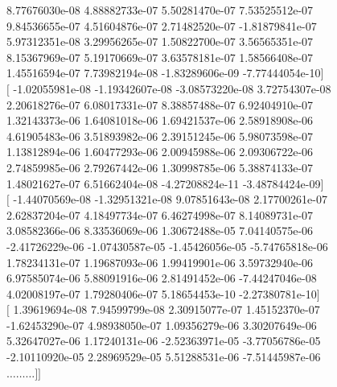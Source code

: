 \documentclass{article}
\begin{document}
    8.77676030e-08   4.88882733e-07   5.50281470e-07   7.53525512e-07 \\
    9.84536655e-07   4.51604876e-07   2.71482520e-07  -1.81879841e-07 \\
    5.97312351e-08   3.29956265e-07   1.50822700e-07   3.56565351e-07 \\
    8.15367969e-07   5.19170669e-07   3.63578181e-07   1.58566408e-07 \\
    1.45516594e-07   7.73982194e-08  -1.83289606e-09  -7.77444054e-10$]$ \\
 $[$ -1.02055981e-08  -1.19342607e-08  -3.08573220e-08   3.72754307e-08 \\
    2.20618276e-07   6.08017331e-07   8.38857488e-07   6.92404910e-07 \\
    1.32143373e-06   1.64081018e-06   1.69421537e-06   2.58918908e-06 \\
    4.61905483e-06   3.51893982e-06   2.39151245e-06   5.98073598e-07 \\
    1.13812894e-06   1.60477293e-06   2.00945988e-06   2.09306722e-06 \\
    2.74859985e-06   2.79267442e-06   1.30998785e-06   5.38874133e-07 \\
    1.48021627e-07   6.51662404e-08  -4.27208824e-11  -3.48784424e-09$]$ \\
 $[$ -1.44070569e-08  -1.32951321e-08   9.07851643e-08   2.17700261e-07 \\
    2.62837204e-07   4.18497734e-07   6.46274998e-07   8.14089731e-07 \\
    3.08582366e-06   8.33536069e-06   1.30672488e-05   7.04140575e-06 \\
   -2.41726229e-06  -1.07430587e-05  -1.45426056e-05  -5.74765818e-06 \\
    1.78234131e-07   1.19687093e-06   1.99419901e-06   3.59732940e-06 \\
    6.97585074e-06   5.88091916e-06   2.81491452e-06  -7.44247046e-08 \\
    4.02008197e-07   1.79280406e-07   5.18654453e-10  -2.27380781e-10$]$ \\
 $[$  1.39619694e-08   7.94599799e-08   2.30915077e-07   1.45152370e-07 \\
   -1.62453290e-07   4.98938050e-07   1.09356279e-06   3.30207649e-06 \\
    5.32647027e-06   1.17240131e-06  -2.52363971e-05  -3.77056786e-05 \\
   -2.10110920e-05   2.28969529e-05   5.51288531e-06  -7.51445987e-06 \\
   $\dots \dots \dots ]]$

\newpage
 

\end{document}
